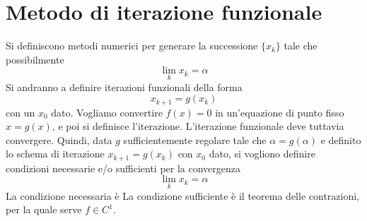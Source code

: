 \documentclass[a4paper]{article}
\begin{document}
\section{Metodo di iterazione funzionale}

Si definiscono metodi numerici per generare la successione
\(\{x_k\}\) tale che possibilmente
\[
    \lim_{k} x_k = \alpha
\]
Si andranno a definire iterazioni funzionali della forma
\[
    x_{k+1} = g(x_k)
\]
con un \(x_0\) dato. Vogliamo convertire \(f(x)=0\) in un'equazione di punto fisso
\(x=g(x)\), e poi si definisce l'iterazione.
L'iterazione funzionale deve tuttavia convergere. Quindi, data \(g\)
sufficientemente regolare tale che \(\alpha = g(\alpha)\)
e definito lo schema di iterazione \(x_{k+1} = g(x_k)\) con \(x_0\) dato,
si vogliono definire condizioni necessarie e/o sufficienti per la convergenza
\[
    \lim_k x_k = \alpha
\]
La condizione necessaria è
\sproof{}{
    \[
        \alpha = \lim_k x_k = \lim_k x_{k+1} = \lim_k g(x_k)
        = g\left( \lim_k x_k \right) = g(\alpha)
    \]
}
La condizione sufficiente è il teorema delle contrazioni, per la quale serve \(f\in C^1\).
\end{document}
